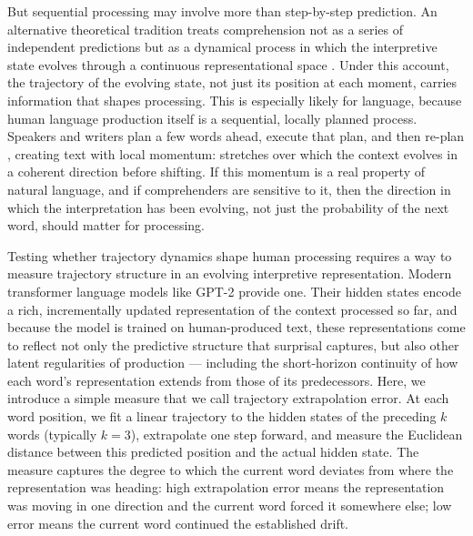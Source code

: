 \documentclass[12pt]{article}
\begin{document}
But sequential processing may involve more than step-by-step prediction. An alternative theoretical tradition treats comprehension not as a series of independent predictions but as a dynamical process in which the interpretive state evolves through a continuous representational space \citep{tabor1999,spivey2007,cho2017}. Under this account, the trajectory of the evolving state, not just its position at each moment, carries information that shapes processing. This is especially likely for language, because human language production itself is a sequential, locally planned process. Speakers and writers plan a few words ahead, execute that plan, and then re-plan \citep{levelt1989,ferreira2002}, creating text with local momentum: stretches over which the context evolves in a coherent direction before shifting. If this momentum is a real property of natural language, and if comprehenders are sensitive to it, then the direction in which the interpretation has been evolving, not just the probability of the next word, should matter for processing.

Testing whether trajectory dynamics shape human processing requires a way to measure trajectory structure in an evolving interpretive representation. Modern transformer language models like GPT-2 \citep{radford2019} provide one. Their hidden states encode a rich, incrementally updated representation of the context processed so far, and because the model is trained on human-produced text, these representations come to reflect not only the predictive structure that surprisal captures, but also other latent regularities of production --- including the short-horizon continuity of how each word's representation extends from those of its predecessors. Here, we introduce a simple measure that we call trajectory extrapolation error. At each word position, we fit a linear trajectory to the hidden states of the preceding $k$ words (typically $k = 3$), extrapolate one step forward, and measure the Euclidean distance between this predicted position and the actual hidden state. The measure captures the degree to which the current word deviates from where the representation was heading: high extrapolation error means the representation was moving in one direction and the current word forced it somewhere else; low error means the current word continued the established drift.
\end{document}
